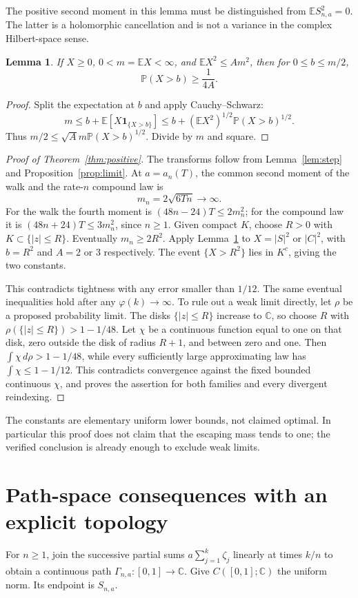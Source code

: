 \documentclass[11pt]{article}
\newtheorem{lemma}[theorem]{Lemma}
\newcommand{\C}{\mathbb C}\newcommand{\R}{\mathbb R}
\newcommand{\E}{\mathbb E}\newcommand{\Pp}{\mathbb P}
\begin{document}
The positive second moment in this lemma must be distinguished from
$\E S_{n,a}^2=0$. The latter is a holomorphic cancellation and is not
a variance in the complex Hilbert-space sense.

\begin{lemma}\label{lem:tail}
If $X\geq0$, $0<m=\E X<\infty$, and $\E X^2\leq A m^2$, then
for $0\leq b\leq m/2$,
\[
 \Pp(X>b)\geq\frac1{4A}.
\]
\end{lemma}
\begin{proof}
Split the expectation at $b$ and apply Cauchy--Schwarz:
\[
 m\leq b+\E[X\mathbf1_{\{X>b\}}]
 \leq b+(\E X^2)^{1/2}\Pp(X>b)^{1/2}.
\]
Thus $m/2\leq \sqrt A m\Pp(X>b)^{1/2}$. Divide by $m$ and square.
\end{proof}

\begin{proof}[Proof of Theorem~\ref{thm:positive}]
The transforms follow from Lemma~\ref{lem:step} and
Proposition~\ref{prop:limit}. At $a=a_n(T)$, the common second moment
of the walk and the rate-$n$ compound law is
\[
 m_n=2\sqrt{6Tn}\longrightarrow\infty.
\]
For the walk the fourth moment is $(48n-24)T\leq2m_n^2$;
for the compound law it is $(48n+24)T\leq3m_n^2$, since $n\geq1$.
Given compact $K$, choose $R>0$ with $K\subset\{|z|\leq R\}$.
Eventually $m_n\geq2R^2$. Apply Lemma~\ref{lem:tail} to $X=|S|^2$
or $|C|^2$, with $b=R^2$ and $A=2$ or $3$ respectively.
The event $\{X>R^2\}$ lies in $K^c$, giving the two constants.

This contradicts tightness with any error smaller than $1/12$.
The same eventual inequalities hold after any $\varphi(k)\to\infty$.
To rule out a weak limit directly, let $\rho$ be a proposed probability
limit. The disks $\{|z|\leq R\}$ increase to $\C$, so choose $R$
with $\rho(\{|z|\leq R\})>1-1/48$. Let $\chi$ be a continuous
function equal to one on that disk, zero outside the disk of radius
$R+1$, and between zero and one. Then
$\int\chi\,d\rho>1-1/48$, while every sufficiently large approximating
law has $\int\chi\leq1-1/12$. This contradicts convergence against
the fixed bounded continuous $\chi$, and proves the assertion for both
families and every divergent reindexing.
\end{proof}

The constants are elementary uniform lower bounds, not claimed optimal.
In particular this proof does not claim that the escaping mass tends to
one; the verified conclusion is already enough to exclude weak limits.

\section{Path-space consequences with an explicit topology}
For $n\geq1$, join the successive partial sums
$a\sum_{j=1}^k\zeta_j$ linearly at times $k/n$ to obtain a continuous
path $\Gamma_{n,a}:[0,1]\to\C$. Give $C([0,1];\C)$ the uniform norm.
Its endpoint is $S_{n,a}$.
\end{document}
